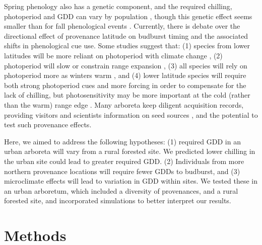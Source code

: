 \documentclass{article}\usepackage[]{graphicx}\usepackage[]{color}
\begin{document}
Spring phenology also has a genetic component, and the required chilling, photoperiod and GDD can vary by population \citep{Scotti2004,Cuervo-Alarcon2018}, though this genetic effect seems smaller than for fall phenological events \citep{McKown2013, Aitken2015, Vico2021}. Currently, there is debate over the directional effect of provenance latitude on budburst timing and the associated shifts in phenological cue use. Some studies suggest that: (1) species from lower latitudes will be more reliant on photoperiod with climate change \citep{Zohner2016}, (2) photoperiod will slow or constrain range expansion \citep{Saikkonen2012}, (3) all species will rely on photoperiod more as winters warm \citep{Way2015}, and (4) lower latitude species will require both strong photoperiod cues and more forcing in order to compensate for the lack of chilling, but photosensitivity may be more important at the cold (rather than the warm) range edge \citep{Gauzere2017}. Many arboreta keep diligent acquisition records, providing visitors and scientists information on seed sources \citep{Dosmann2006}, and the potential to test such provenance effects. 

Here, we aimed to address the following hypotheses: (1) required GDD in an urban arboreta will vary from a rural forested site. We predicted lower chilling in the urban site could lead to greater required GDD. (2) Individuals from more northern provenance locations will require fewer GDDs to budburst, and (3) microclimate effects will lead to variation in GDD within sites. We tested these in an urban arboretum, which included a diversity of provenances, and a rural forested site, and incorporated simulations to better interpret our results. 

\section*{Methods}
\end{document}
